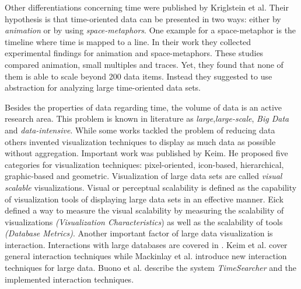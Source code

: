 Other differentiations concerning time were published by Kriglstein et al\cite{Kriglstein2014}. Their hypothesis is that time-oriented data can be presented in two ways: either by \textit{animation} or by using \textit{space-metaphors}. One example for a space-metaphor is the timeline where time is mapped to a line. In their work they collected experimental findings for animation and space-metaphors. These studies compared animation, small multiples and traces. Yet, they found that none of them is able to scale beyond 200 data items\cite{Robertson2013}. Instead they suggested to use abstraction for analyzing large time-oriented data sets. 
\par
Besides the properties of data regarding time, the volume of data is an active research area. This problem is known in literature as
\textit{large}\cite{PiringerHarald2011,Keim2001,Keim1996,tennekes2013visualizing, Yang2003, Keim2005, Wickham2013},\textit{large-scale}\cite{Leonard,PiringerHarald2011,Cuzzocrea,Keim2005}, \textit{Big Data}\cite{Patil,KeaheyUsingData,chen2012business} and \textit{data-intensive}\cite{PhilipChen2014,S.MD.MUJEEB2005}.
While some works tackled the problem of reducing data others invented visualization techniques to display as much data as possible without aggregation\cite{Krzywinski2009,Luo2012,Fekete2002}. Important work was published by Keim\cite{Keim1996}. He proposed five categories for visualization techniques: pixel-oriented\cite{Keim1995,Stein2013,Keim2000,keim1996pixel,Keim2001, Keim2005,Keim2008VisualChallenges}, icon-based\cite{Chung2014,Borgo2013,Fanea2005}, hierarchical\cite{Yang2003,Shneiderman1992,LeBlanc1990}, graphic-based and geometric\cite{Noirhomme-Fraiture2002}. Visualization of large data sets are called \textit{visual scalable} visualizations. Visual or perceptual scalability is defined as the capability of visualization tools of displaying large data sets in an effective manner\cite{Eick2002}. Eick defined a way to measure the visual scalability by measuring the scalability of visualizations \textit{(Visualization Characteristics}) as well as the scalability of tools \textit{(Database Metrics)}. 
Another important factor of large data visualization is interaction. Interactions with large databases are covered in \cite{Buono,Jerding1998,mackinlay1991perspective,Keim2005}. Keim et al.\cite{Keim2005} cover general interaction techniques while Mackinlay et al. introduce new interaction techniques for large data\cite{mackinlay1991perspective}. Buono et al. describe the system \textit{TimeSearcher} and the implemented interaction techniques\cite{Buono}.
